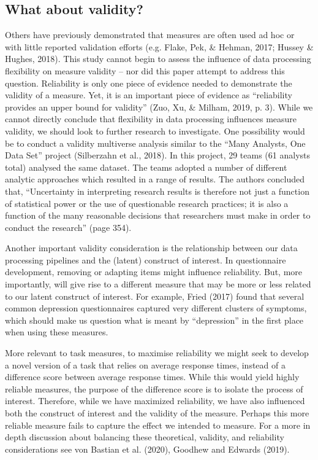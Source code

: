 \documentclass[
  english,
  man,floatsintext]{apa6}
\begin{document}
\hypertarget{what-about-validity}{%
\subsection{What about validity?}\label{what-about-validity}}

Others have previously demonstrated that measures are often used ad hoc or with little reported validation efforts (e.g. Flake, Pek, \& Hehman, 2017; Hussey \& Hughes, 2018). This study cannot begin to assess the influence of data processing flexibility on measure validity -- nor did this paper attempt to address this question. Reliability is only one piece of evidence needed to demonstrate the validity of a measure. Yet, it is an important piece of evidence as ``reliability provides an upper bound for validity'' (Zuo, Xu, \& Milham, 2019, p. 3). While we cannot directly conclude that flexibility in data processing influences measure validity, we should look to further research to investigate. One possibility would be to conduct a validity multiverse analysis similar to the ``Many Analysts, One Data Set'' project (Silberzahn et al., 2018). In this project, 29 teams (61 analysts total) analysed the same dataset. The teams adopted a number of different analytic approaches which resulted in a range of results. The authors concluded that, ``Uncertainty in interpreting research results is therefore not just a function of statistical power or the use of questionable research practices; it is also a function of the many reasonable decisions that researchers must make in order to conduct the research'' (page 354).

Another important validity consideration is the relationship between our data processing pipelines and the (latent) construct of interest. In questionnaire development, removing or adapting items might influence reliability. But, more importantly, will give rise to a different measure that may be more or less related to our latent construct of interest. For example, Fried (2017) found that several common depression questionnaires captured very different clusters of symptoms, which should make us question what is meant by ``depression'' in the first place when using these measures.

More relevant to task measures, to maximise reliability we might seek to develop a novel version of a task that relies on average response times, instead of a difference score between average response times. While this would yield highly reliable measures, the purpose of the difference score is to isolate the process of interest. Therefore, while we have maximized reliability, we have also influenced both the construct of interest and the validity of the measure. Perhaps this more reliable measure fails to capture the effect we intended to measure. For a more in depth discussion about balancing these theoretical, validity, and reliability considerations see von Bastian et al. (2020), Goodhew and Edwards (2019).
\end{document}
